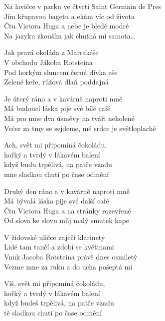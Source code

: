 
\ve{}
Na lavičce v parku ve čtvrti Saint Germain de Pres \\
Jím křupavou bagetu a ekám víc od života \\
Čtu Victora Huga a nebe je bledě modré \\
Na jazyku zkouším jak chutná mi samota\ldots

Jak pravá okoláda z Marrakéše \\
V obchodu Jákoba Rotsteina \\
Pod horkým sluncem černá dívka eše \\
Zelené keře, růžová dlaň poddajná 
 
\ve{}
Je úterý ráno a v kavárně naproti mně \\
Má budoucí láska pije své bílé café \\
Má pro mne dva úsměvy na tváři neholené \\
Večer za tmy se sejdeme, mé srdce je světloplaché 

\cho{}
Ach, svět mi připomíná čokoládu, \\
hořký a tvrdý v lákavém balení \\
když budu trpělivá, na patře vzadu \\
mne sladkou chutí po čase odmění 

\ve{}
Druhý den ráno a v kavárně naproti mně \\
Má bývalá láska pije své další café \\
Čtu Victora Huga a na stránky rozevřené \\
Od slova ke slovu můj malý smutek kape 

\ve{}
V židovské uličce zaječí klarinety \\
Lidé tam tančí a zdobí se květinami \\
Vnuk Jacoba Rotsteina právě dnes osmiletý\\
Vezme mne za ruku a do ucha pošeptá mi 
 
\cho{}
Víš, svět mi připomíná čokoládu,\\
hořký a tvrdý v lákavém balení\\
když budeš trpělivá, na patře vzadu\\
tě sladkou chutí po čase odmění


\esong{}